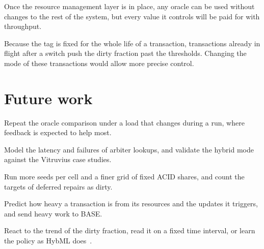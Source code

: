Once the resource management layer is in place, any oracle can be used without
changes to the rest of the system, but every value it controls will be paid for
with throughput.

Because the tag is fixed for the whole life of a transaction, transactions
already in flight after a switch push the dirty fraction past the thresholds.
Changing the mode of these transactions would allow more precise control.

\section{Future work}\label{sec:future-work}

\begin{bullets}
  \item[Varying load.] Repeat the oracle comparison under a load that changes
  during a run, where feedback is expected to help most.

  \item[Real multi-model system.] Model the latency and failures of arbiter
  lookups, and validate the hybrid mode against the Vitruvius case studies.

  \item[Stronger statistics.] Run more seeds per cell and a finer grid of fixed
  ACID shares, and count the targets of deferred repairs as dirty.

  \item[Transaction-aware oracle.] Predict how heavy a transaction is from its
  resources and the updates it triggers, and send heavy work to BASE.

  \item[Other oracle policies.] React to the trend of the dirty fraction, read
  it on a fixed time interval, or learn the policy as HybML
  does~\cite{kobus2018htr}.
\end{bullets}
